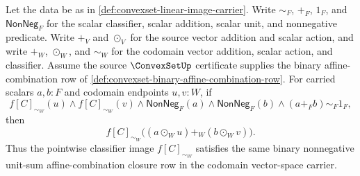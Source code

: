 \begin{theorem}
\label{thm:convexset-linear-image-affine-combination-closure}
Let the data be as in \autoref{def:convexset-linear-image-carrier}. Write $\sim_F$, $+_F$, $1_F$, and $\mathsf{NonNeg}_F$ for the scalar classifier, scalar addition, scalar unit, and nonnegative predicate. Write $+_V$ and $\odot_V$ for the source vector addition and scalar action, and write $+_W$, $\odot_W$, and $\sim_W$ for the codomain vector addition, scalar action, and classifier. Assume the source $\ConvexSetUp$ certificate supplies the binary affine-combination row of \autoref{def:convexset-binary-affine-combination-row}. For carried scalars $a,b:F$ and codomain endpoints $u,v:W$, if
$$
f[C]_{\sim_W}(u)\land f[C]_{\sim_W}(v)\land
\mathsf{NonNeg}_F(a)\land\mathsf{NonNeg}_F(b)\land
(a+_F b)\sim_F1_F,
$$
then
$$
f[C]_{\sim_W}\bigl((a\odot_W u)+_W(b\odot_W v)\bigr).
$$
Thus the pointwise classifier image $f[C]_{\sim_W}$ satisfies the same binary nonnegative unit-sum affine-combination closure row in the codomain vector-space carrier.
\end{theorem}
